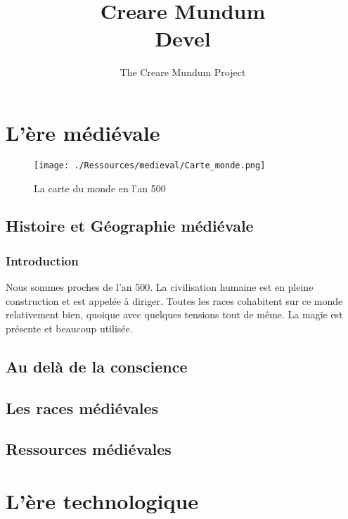 \documentclass{book}
\title{Creare Mundum \\ Devel}
\author{The Creare Mundum Project}
\date{\oldstylenums{\insertdate}}
\begin{document}
\maketitle
\setcounter{tocdepth}{2} %
\renewcommand{\contentsname}{Sommaire} 
\tableofcontents

\part{L'ère médiévale}
\begin{figure}
\begin{center}
\hypertarget{cartedumonde}{}
\texttt{[image: ./Ressources/medieval/Carte\_monde.png]}
\caption{La carte du monde en l'an 500}
\end{center}
\end{figure}
\chapter{Histoire et Géographie médiévale}
\section{Introduction}
Nous sommes proches de l'an 500. La civilisation humaine est en pleine construction et est appelée à diriger.
Toutes les races cohabitent sur ce monde relativement bien, quoique avec quelques tensions tout de même.
La magie est présente et beaucoup utilisée.

 

\chapter{Au delà de la conscience}




\chapter{Les races médiévales}


\chapter{Ressources médiévales}


\part{L'ère technologique}
\end{document}

